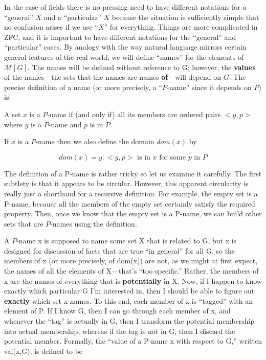 \documentclass[10pt]{article}
\newcommand\axiom[1]{\textmd{#1}}
\begin{document}
In the case of fields there is no pressing need to have different notations for a ``general'' $X$ and a ``particular'' $X$ because the situation is sufficiently simple that no confusion arises if we use ``$X$'' for everything. Things are more complicated in \axiom{ZFC}, and it is important to have different notations for the ``general'' and ``particular'' cases. By analogy with the way natural language mirrors certain general features of the real world, we will define ``names'' for the elements of $\mathcal{M}[G]$. The names will be defined without reference to G; however, the \textbf{values} of the names---the sets that the names are names \textbf{of}---will depend on $G$. The precise definition of a name (or more precisely, a ``$P$-name'' since it depends on $P$) is:

 A set $x$ is a $P$-name if (and only if) all its members are
 ordered pairs $<y,p>$ where $y$ is a $P$-name and $p$ is in $P$.

If $x$ is a $P$-name then we also define the domain $dom(x)$ by

 $$dom(x) = {y : <y,p>\text{ is in }x\text{ for some }p\text{ in }P}$$

The definition of a P-name is rather tricky so let us examine it carefully. The first subtlety is that it appears to be circular. However, this apparent circularity is really just a shorthand for a recursive definition. For example, the empty set is a P-name, because all the members of the empty set certainly satisfy the required property. Then, once we know that the empty set is a P-name, we can build other sets that are $P$-names using the definition.

A $P$-name x is supposed to name some set X that is related to G, but x is designed for discussion of facts that are true ``in general'' for all G, so the members of x (or more precisely, of dom(x)) are not, as we might at first expect, the names of all the elements of X---that's ``too specific.'' Rather, the members of x are the names of everything that is \textbf{potentially} in X. Now, if I happen to know exactly which particular G I'm interested in, then I should be able to figure out \textbf{exactly} which set x names. To this end, each member of x is ``tagged'' with an element of P. If I know G, then I can go through each member of x, and whenever the ``tag'' is actually in G, then I transform the potential membership into actual membership, whereas if the tag is not in G, then I discard the potential member. Formally, the ``value of a P-name x with respect to G,'' written val(x,G), is defined to be
\end{document}
